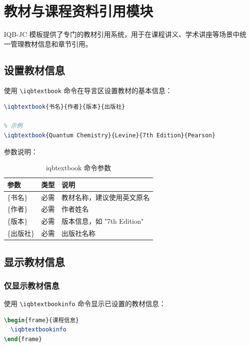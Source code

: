 \section{教材与课程资料引用模块}

IQB-JC 模板提供了专门的教材引用系统，用于在课程讲义、学术讲座等场景中统一管理教材信息和章节引用。

\subsection{设置教材信息}

使用 \lstinline|\iqbtextbook| 命令在导言区设置教材的基本信息：

\begin{lstlisting}[style=blockstyle,language=TeX]
% 在导言区设置
\iqbtextbook{书名}{作者}{版本}{出版社}

% 示例
\iqbtextbook{Quantum Chemistry}{Levine}{7th Edition}{Pearson}
\end{lstlisting}

参数说明：

\begin{table}[!h]
\centering
\caption{iqbtextbook 命令参数}
\label{tab:iqbtextbook-params}
\begin{tabular}{p{2.5cm}p{2.5cm}p{7cm}}
\toprule
\textbf{参数} & \textbf{类型} & \textbf{说明} \\
\midrule
\{书名\} & 必需 & 教材名称，建议使用英文原名 \\
\{作者\} & 必需 & 作者姓名 \\
\{版本\} & 必需 & 版本信息，如 "7th Edition" \\
\{出版社\} & 必需 & 出版社名称 \\
\bottomrule
\end{tabular}
\end{table}

\subsection{显示教材信息}

\subsubsection{仅显示教材信息}

使用 \lstinline|\iqbtextbookinfo| 命令显示已设置的教材信息：

\begin{lstlisting}[style=blockstyle,language=TeX]
\begin{frame}{课程信息}
  \iqbtextbookinfo
\end{frame}
\end{lstlisting}

